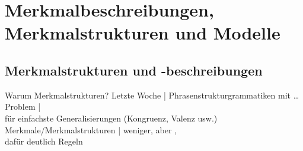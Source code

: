 {%
% 
% 
}{
\section{Merkmalbeschreibungen, Merkmalstrukturen und Modelle}
%
}

\subsection{Merkmalstrukturen und -beschreibungen}

\begin{frame}
  {Warum Merkmalstrukturen?}
  \vspace{\baselineskip}
  Letzte Woche | Phrasenstrukturgrammatiken mit \ldots\\
  \vspace{\baselineskip}
  Problem | \\
  für einfachste Generalisierungen (Kongruenz, Valenz usw.)\\
  \vspace{\baselineskip}
  Merkmale\slash Merkmalstrukturen | weniger, aber ,\\
  dafür deutlich  Regeln
\end{frame}

